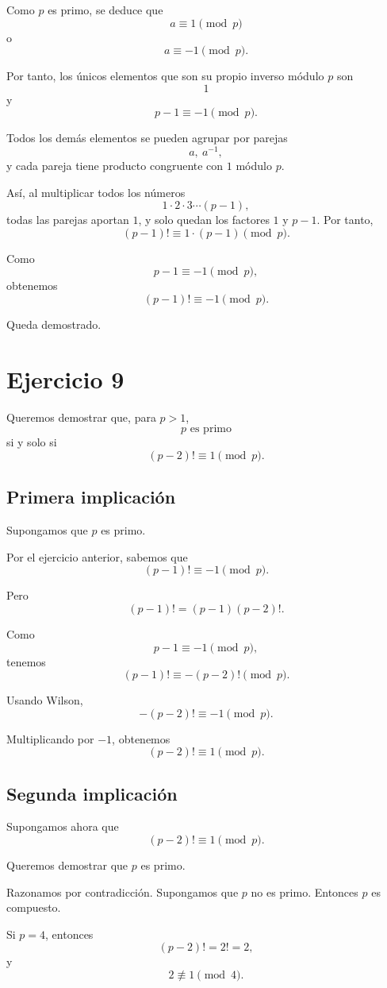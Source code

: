 \documentclass[12pt]{article}
\begin{document}
Como \(p\) es primo, se deduce que
\[
a\equiv 1 \pmod p
\]
o
\[
a\equiv -1 \pmod p.
\]

Por tanto, los únicos elementos que son su propio inverso módulo \(p\) son
\[
1
\]
y
\[
p-1\equiv -1 \pmod p.
\]

Todos los demás elementos se pueden agrupar por parejas
\[
a,\ a^{-1},
\]
y cada pareja tiene producto congruente con \(1\) módulo \(p\).

Así, al multiplicar todos los números
\[
1\cdot 2\cdot 3\cdots(p-1),
\]
todas las parejas aportan \(1\), y solo quedan los factores \(1\) y \(p-1\). Por tanto,
\[
(p-1)! \equiv 1\cdot(p-1) \pmod p.
\]

Como
\[
p-1\equiv -1 \pmod p,
\]
obtenemos
\[
(p-1)! \equiv -1 \pmod p.
\]

Queda demostrado.

\section*{Ejercicio 9}

Queremos demostrar que, para \(p>1\),
\[
p \text{ es primo}
\]
si y solo si
\[
(p-2)! \equiv 1 \pmod p.
\]

\subsection*{Primera implicación}

Supongamos que \(p\) es primo.

Por el ejercicio anterior, sabemos que
\[
(p-1)! \equiv -1 \pmod p.
\]

Pero
\[
(p-1)!=(p-1)(p-2)!.
\]

Como
\[
p-1\equiv -1 \pmod p,
\]
tenemos
\[
(p-1)!\equiv -(p-2)! \pmod p.
\]

Usando Wilson,
\[
-(p-2)! \equiv -1 \pmod p.
\]

Multiplicando por \(-1\), obtenemos
\[
(p-2)! \equiv 1 \pmod p.
\]

\subsection*{Segunda implicación}

Supongamos ahora que
\[
(p-2)! \equiv 1 \pmod p.
\]

Queremos demostrar que \(p\) es primo.

Razonamos por contradicción. Supongamos que \(p\) no es primo. Entonces \(p\) es compuesto.

Si \(p=4\), entonces
\[
(p-2)!=2!=2,
\]
y
\[
2\not\equiv 1 \pmod 4.
\]
\end{document}
